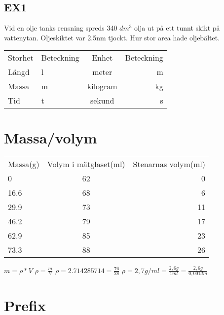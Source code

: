 \documentclass[a4paper,11pt]{article}
\begin{document}
\begin{flushleft}
\subsection{EX1} Vid en olje tanks rensning spreds 340 $ dm^3 $ olja ut på ett tunnt skikt på vattenytan.
Oljeskiktet var 2.5nm tjockt.\newline
Hur stor area hade oljebältet.
\newline
\begin{tabular}{l l | c r}
  Storhet & Beteckning & Enhet & Beteckning\\
  Längd & l & meter & m\\
  Massa & m & kilogram & kg\\
  Tid & t & sekund & s\\
\end{tabular}

\section{Massa/volym}

\begin{tabular}{l c r}
  Massa(g) & Volym i mätglaset(ml) & Stenarnas volym(ml)\\
  0 & 62 & 0\\
  16.6 & 68 & 6\\
  29.9 & 73 & 11\\
  46.2 & 79 & 17\\
  62.9 & 85 & 23\\
  73.3 & 88 & 26\\
\end{tabular}
\newline
\newline
$ m = \rho * V  $
\newline
$ \rho = \frac{m}{V} $
\newline
$ \rho = 2.714285714 = \frac{76}{28} $\newline
$ \rho = 2,7 g/ml = \frac{2,6 g}{1 ml} = \frac{2,6 g}{0,001 dm} $
\newpage
\section{Prefix}


\end{flushleft}
\end{document}

